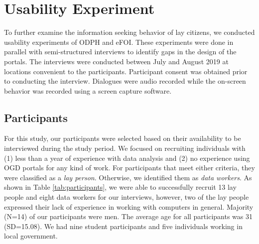 \documentclass{sigchi}
\begin{document}
\section{Usability Experiment}
To further examine the information seeking behavior of lay citizens, we conducted usability experiments of ODPH and eFOI. These experiments were done in parallel with semi-structured interviews to identify gaps in the design of the portals. The interviews were conducted between July and August 2019 at locations convenient to the participants. Participant consent was obtained prior to conducting the interview. Dialogues were audio recorded while the on-screen behavior was recorded using a screen capture software. 

\subsection{Participants}
For this study, our participants were selected based on their availability to be interviewed during the study period. We focused on recruiting individuals with (1) less than a year of experience with data analysis and (2) no experience using OGD portals for any kind of work. For participants that meet either criteria, they were classified as a \textit{lay person}. Otherwise, we identified them as \textit{data workers}. As shown in Table \ref{tab:participants}, we were able to successfully recruit 13 lay people and eight data workers for our interviews, however, two of the lay people expressed their lack of experience in working with computers in general. Majority (N=14) of our participants were men. The average age for all participants was 31 (SD=15.08). We had nine student participants and five individuals working in local government.
\end{document}
